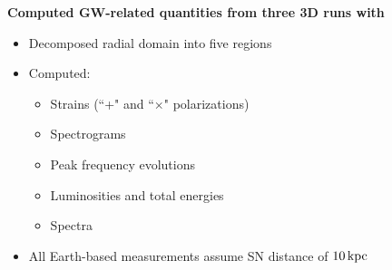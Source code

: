 \documentclass[aspectratio=169]{beamer}
\begin{document}
\begin{frame}

  \textbf{Computed GW-related quantities from three 3D runs with}
  \chimera{}
  \begin{itemize}
    \item Decomposed radial domain into five regions
    \item Computed:
    \begin{itemize}
      \item Strains (``+" and ``$\times$" polarizations)
      \item Spectrograms
      \item Peak frequency evolutions
      \item Luminosities and total energies
      \item Spectra
    \end{itemize}
    \item All Earth-based measurements assume SN distance of $10\,\mathrm{kpc}$
  \end{itemize}

\end{frame}
\end{document}
